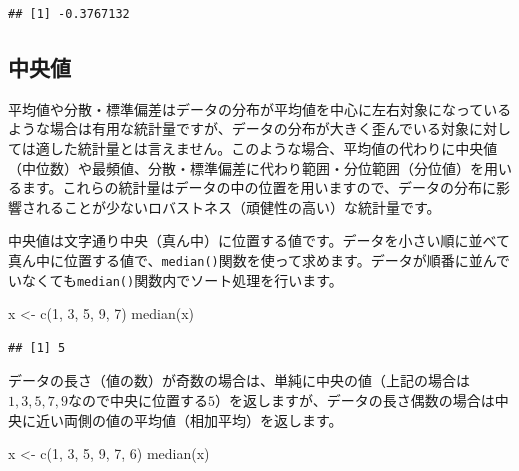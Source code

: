 \documentclass[
  12pt,
]{book}
\newenvironment{Shaded}{\begin{snugshade}}{\end{snugshade}}
\newcommand{\DecValTok}[1]{\textcolor[rgb]{0.00,0.00,0.81}{#1}}
\newcommand{\FunctionTok}[1]{\textcolor[rgb]{0.00,0.00,0.00}{#1}}
\newcommand{\NormalTok}[1]{#1}
\newcommand{\OtherTok}[1]{\textcolor[rgb]{0.56,0.35,0.01}{#1}}
\begin{document}
\begin{verbatim}
## [1] -0.3767132
\end{verbatim}

\hypertarget{ux4e2dux592eux5024}{%
\subsection{中央値}\label{ux4e2dux592eux5024}}

平均値や分散・標準偏差はデータの分布が平均値を中心に左右対象になっているような場合は有用な統計量ですが、データの分布が大きく歪んでいる対象に対しては適した統計量とは言えません。このような場合、平均値の代わりに中央値（中位数）や最頻値、分散・標準偏差に代わり範囲・分位範囲（分位値）を用いるます。これらの統計量はデータの中の位置を用いますので、データの分布に影響されることが少ないロバストネス（頑健性の高い）な統計量です。

中央値は文字通り中央（真ん中）に位置する値です。データを小さい順に並べて真ん中に位置する値で、\texttt{median()}関数を使って求めます。データが順番に並んでいなくても\texttt{median()}関数内でソート処理を行います。

\begin{Shaded}
\begin{Highlighting}[numbers=left,,]
\NormalTok{x }\OtherTok{\textless{}{-}} \FunctionTok{c}\NormalTok{(}\DecValTok{1}\NormalTok{, }\DecValTok{3}\NormalTok{, }\DecValTok{5}\NormalTok{, }\DecValTok{9}\NormalTok{, }\DecValTok{7}\NormalTok{)}
\FunctionTok{median}\NormalTok{(x)}
\end{Highlighting}
\end{Shaded}

\begin{verbatim}
## [1] 5
\end{verbatim}

データの長さ（値の数）が奇数の場合は、単純に中央の値（上記の場合は\(1, 3, 5, 7, 9\)なので中央に位置する\(5\)）を返しますが、データの長さ偶数の場合は中央に近い両側の値の平均値（相加平均）を返します。

\begin{Shaded}
\begin{Highlighting}[numbers=left,,]
\NormalTok{x }\OtherTok{\textless{}{-}} \FunctionTok{c}\NormalTok{(}\DecValTok{1}\NormalTok{, }\DecValTok{3}\NormalTok{, }\DecValTok{5}\NormalTok{, }\DecValTok{9}\NormalTok{, }\DecValTok{7}\NormalTok{, }\DecValTok{6}\NormalTok{)}
\FunctionTok{median}\NormalTok{(x)}
\end{Highlighting}
\end{Shaded}
\end{document}
